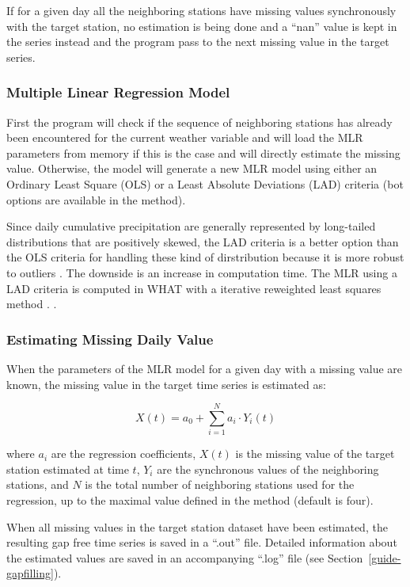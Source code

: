\documentclass[WHATMANUAL.tex]{subfiles}
\begin{document}
If for a given day all the neighboring stations have missing values synchronously with the target station, no estimation is being done and a ``nan'' value is kept in the series instead and the program pass to the next missing value in the target series.

\subsubsection{Multiple Linear Regression Model}

First the program will check if the sequence of neighboring stations has already been encountered for the current weather variable and will load the MLR parameters from memory if this is the case and will directly estimate the missing value. Otherwise, the model will generate a new MLR model using either an Ordinary Least Square (OLS) or a Least Absolute Deviations (LAD) criteria (bot options are available in the method).

Since daily cumulative precipitation are generally represented by long-tailed distributions that are positively skewed, the LAD criteria is a better option than the OLS criteria for handling these kind of dirstribution because it is more robust to outliers \citep{eischeid_quality_1995,eischeid_creating_2000}. The downside is an increase in computation time. The MLR using a LAD criteria is computed in WHAT with a iterative reweighted least squares method \citep{schlossmacher_iterative_1973}.  \citep{eischeid_quality_1995}. 
 
\subsubsection{Estimating Missing Daily Value}

When the parameters of the MLR model for a given day with a missing value are known, the missing value in the target time series is estimated as:

\begin{equation}
    X(t) = a_0 + \sum_{i=1}^{N} a_i \cdot Y_i(t)
\end{equation}

where $a_i$ are the regression coefficients, $X(t)$ is the missing value of the target station estimated at time $t$, $Y_i$ are the synchronous values of the neighboring stations, and $N$ is the total number of neighboring stations used for the regression, up to the maximal value defined in the method (default is four).

When all missing values in the target station dataset have been estimated, the resulting gap free time series is saved in a ``.out'' file. Detailed information about the estimated values are saved in an accompanying ``.log'' file (see Section~\ref{guide-gapfilling}).
\end{document}
